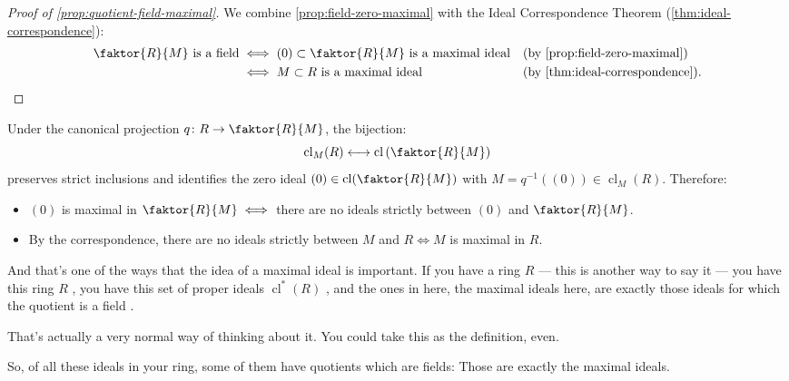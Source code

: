 \begin{content}
\begin{proof}[Proof of \cref{prop:quotient-field-maximal}]
We combine \cref{prop:field-zero-maximal} with the Ideal Correspondence Theorem (\cref{thm:ideal-correspondence}):
\begin{align*}
\faktor{R}{M} \text{ is a field} &\iff (0) \subset \faktor{R}{M} \text{ is a maximal ideal} && (\text{by \cref{prop:field-zero-maximal}}) \\
&\iff M \subset R \text{ is a maximal ideal} && (\text{by \cref{thm:ideal-correspondence}}).
\end{align*}
\end{proof}

\begin{steps}
Under the canonical projection $q \colon R \to \faktor{R}{M}$, the bijection:
\[
\operatorname{cl}_M(R) \longleftrightarrow \operatorname{cl}\left(\faktor{R}{M}\right)
\]
preserves strict inclusions and identifies the zero ideal $(0) \in \operatorname{cl}(\faktor{R}{M})$ with $M = q^{-1}((0)) \in \operatorname{cl}_M(R)$.
Therefore:
\begin{itemize}
    \item $(0)$ is maximal in $\faktor{R}{M} \iff$ there are no ideals strictly between $(0)$ and $\faktor{R}{M}$.
    \item By the correspondence, there are no ideals strictly between $M$ and $R \iff M$ is maximal in $R$.
\end{itemize}
\end{steps}
\end{content}

\begin{speech}[00:25:02 - 00:26:03]
And that's one of the ways that the idea of a maximal ideal is important. If you have a ring $R$ --- this is another way to say it --- you have this ring $R$ , you have this set of proper ideals $\operatorname{cl}^*(R)$ , and the ones in here, the maximal ideals here, are exactly those ideals for which the quotient is a field .

That's actually a very normal way of thinking about it. You could take this as the definition, even.

So, of all these ideals in your ring, some of them have quotients which are fields: Those are exactly the maximal ideals.
\end{speech}

